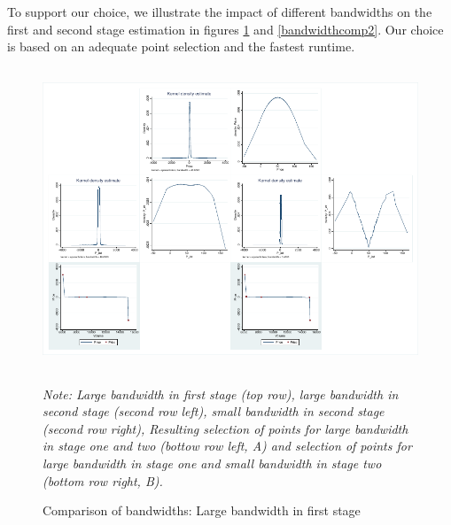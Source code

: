 \begin{subappendices}
To support our choice, we illustrate the impact of different bandwidths on the first and second stage estimation in figures \ref{bandwidthcomp1} and \ref{bandwidthcomp2}. Our choice is based on an adequate point selection and the fastest runtime. 


\begin{figure}[!ht]
\begin{center}
\includegraphics[trim=0.2cm 0.25cm 0.2cm 0.2cm, clip=true, height=90mm]{figch2/comparison1.pdf} 
\caption{Comparison of bandwidths: Large bandwidth in first stage}
\label{bandwidthcomp1}
\end{center}
\emph{Note: Large bandwidth in first stage (top row), large bandwidth in second stage (second row left), small bandwidth in second stage (second row right), Resulting selection of points for large bandwidth in stage one and two (bottow row left, A) and selection of points for large bandwidth in stage one and small bandwidth in stage two (bottom row right, B).}
\end{figure}



\end{subappendices}
